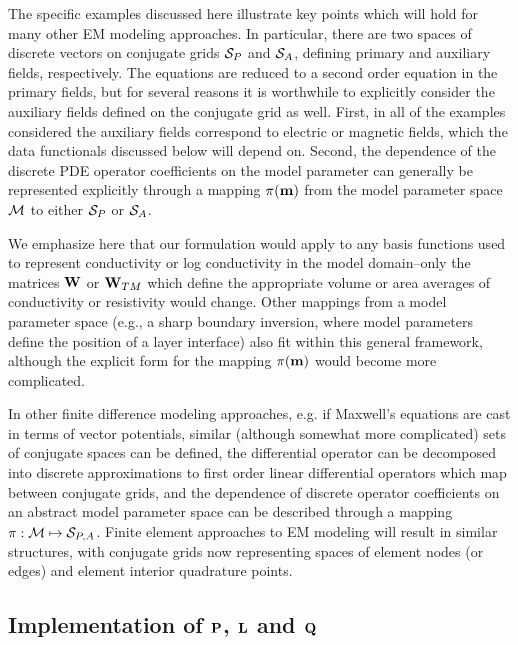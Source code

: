 The specific examples discussed here 
illustrate key points which
will hold for many other EM modeling approaches.
In particular, there are two spaces of discrete vectors on 
conjugate grids ${\cal S}_P$ and ${\cal S}_A$,
defining primary and auxiliary fields, respectively.
The equations are reduced to a second order equation in
the primary fields, but for several reasons it is
worthwhile to explicitly consider the auxiliary fields defined
on the conjugate grid as well.  First, in all of the examples 
considered the auxiliary fields correspond to electric
or magnetic fields, which the data functionals discussed
below will depend on.
Second, the dependence of the discrete PDE
operator coefficients on the model parameter can
generally be represented explicitly through a mapping
$\pi({\bf m})$ from the model parameter space $\cal M$ to
either ${\cal S}_P$ or ${\cal S}_A$.

We emphasize here that our formulation would apply
to any basis functions used to represent conductivity 
or log conductivity in the model domain--only
the matrices ${\bf W}$ or ${\bf W}_{TM}$ which define
the appropriate volume or area averages of conductivity
or resistivity would change.  Other mappings from 
a model parameter space (e.g., a sharp boundary inversion,
where model parameters define the position of a layer interface)
also fit within this general framework,
although the explicit form for the mapping $\pi({\bf m})$ would
become more complicated.

In other finite difference modeling approaches, 
e.g. if Maxwell's equations
are cast in terms of vector potentials, similar (although
somewhat more complicated) sets of conjugate spaces can
be defined, the differential operator can be decomposed into
discrete approximations to first order linear differential
operators which map between conjugate grids, and the 
dependence of discrete operator coefficients on an abstract
model parameter space can be described through a mapping
$\pi : {\cal M} \mapsto {\cal S}_{P,A}$.  Finite element approaches
to EM modeling will result in similar structures, with 
conjugate grids now representing spaces of element nodes
(or edges) and element interior quadrature points.

\subsection{Implementation of ${\bf P}$, ${\bf L}$ and ${\bf Q}$}

